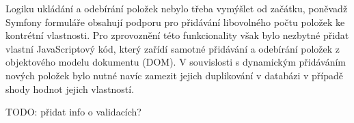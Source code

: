 Logiku ukládání a odebírání položek nebylo třeba vymýšlet od začátku, poněvadž Symfony formuláře obsahují podporu pro přidávání libovolného počtu položek ke kontrétní vlastnosti. Pro zprovoznění této funkcionality však bylo nezbytné přidat vlastní JavaScriptový kód, který zařídí samotné přidávání a odebírání položek z objektového modelu dokumentu (DOM). V souvislosti s dynamickým přidáváním nových položek bylo nutné navíc zamezit jejich duplikování v databázi v případě shody hodnot jejich vlastností.

TODO: přidat info o validacích?
